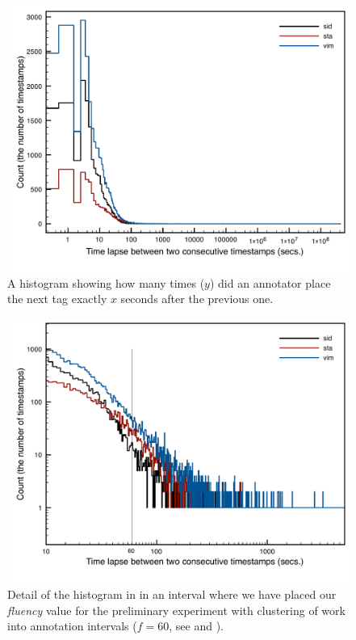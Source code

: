 \begin{figure}[htbp]
   \centering
   \includegraphics[width=.8\textwidth]{images/speed/histograms} 
   \caption{A histogram showing how many times ($y$) did an annotator place the next tag exactly $x$ seconds after the previous one.} 
   \label{fig:hist}
\end{figure}

\begin{figure}[htbp]
   \centering
   \includegraphics[width=.8\textwidth]{images/speed/histograms-detail} 
   \caption{Detail of the histogram in  in an interval where we have placed our \emph{fluency} value for the preliminary experiment with clustering of work into annotation intervals ($f=60$, see  and ).}
\label{fig:hist-detail}
\end{figure}


